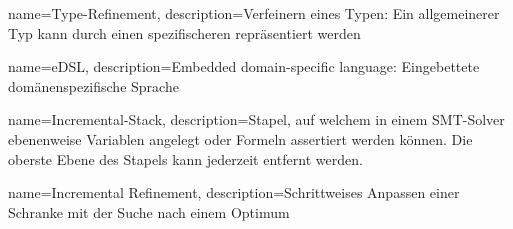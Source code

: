 {
    name=Type-Refinement,
    description={Verfeinern eines Typen: Ein allgemeinerer Typ kann durch einen spezifischeren repräsentiert werden}
}

{
    name=eDSL,
    description={Embedded domain-specific language: Eingebettete domänenspezifische Sprache}
}

{
    name=Incremental-Stack,
    description={Stapel, auf welchem in einem SMT-Solver ebenenweise Variablen angelegt oder Formeln assertiert werden können. Die oberste Ebene des Stapels kann jederzeit entfernt werden.}
}

{
    name=Incremental Refinement,
    description={Schrittweises Anpassen einer Schranke mit der Suche nach einem Optimum}
}
